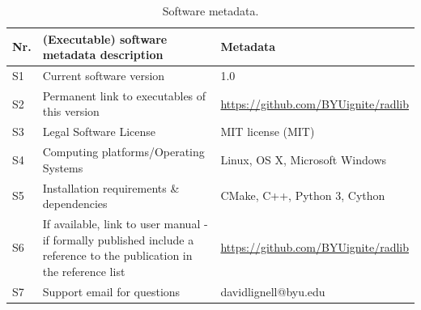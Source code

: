 \documentclass[preprint,12pt, a4paper]{elsarticle}
\begin{document}
\begin{table}[!h]
\begin{tabular}{|l|p{6.5cm}|p{6.5cm}|}
\hline
\textbf{Nr.} & \textbf{(Executable) software metadata description} & \textbf{Metadata} \\
\hline
S1 & Current software version & 1.0 \\
\hline
S2 & Permanent link to executables of this version  & \href{https://github.com/BYUignite/radlib}{https://github.com/BYUignite/radlib} \\
\hline
S3 & Legal Software License & MIT license (MIT) \\
\hline
S4 & Computing platforms/Operating Systems & Linux, OS X, Microsoft Windows\\
\hline
S5 & Installation requirements \& dependencies & CMake, C++, Python 3, Cython \\
\hline
S6 & If available, link to user manual - if formally published include a reference to the publication in the reference
    list & \href{https://github.com/BYUignite/radlib}{https://github.com/BYUignite/radlib} \\
\hline
S7 & Support email for questions & davidlignell@byu.edu \\
\hline
\end{tabular}
\caption{Software metadata.}
\label{} 
\end{table}
\end{document}
